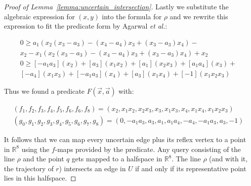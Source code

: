 \documentclass[a4paper, UKenglish]{lipics-v2018}
\newcommand{\etal}{\textit{et al.}\xspace}
\begin{document}
\begin{proof}[Proof of Lemma~\ref{lemma:uncertain_intersection}]
Lastly we substitute the algebraic expression for $(x,y)$ into the formula for $\rho$ and we rewrite this expression to fit the predicate form by Agarwal \etal \cite{agarwal2013range}:

\begin{align*}
    0 \ge a_1 (x_2 (x_3 - a_3) - (x_4 - a_4)x_3 + (x_3 - a_3) x_4) - \\
    x_2 - x_1 (x_2 (x_3 - a_3) - (x_4 - a_4)x_3 + (x_3 - a_3) x_4) + x_2 \\
    0 \ge [-a_1 a_3] (x_2) + [a_3]( x_1 x_2) + [a_1] (x_2 x_3) + [a_1a_4] (x_3) + \\
    [- a_4] (x_1 x_3) + [- a_1 a_3]( x_4) + [a_3] (x_1 x_4) + [-1](x_1 x_2 x_3)
\end{align*}

Thus we found a predicate $F(\vec{x}, \vec{a})$ with:

\begin{align*}
    (f_1, f_2, f_3, f_4, f_5, f_6, f_6, f_8) = (x_2, x_1x_2, x_2x_3, x_3, x_1x_3, x_4, x_1x_4, x_1x_2x_3) \\
    (g_0, g_1, g_2, g_3, g_4, g_5,g_6, g_7,g_8) = (0, -a_1a_3, a_3, a_1, a_1a_4, -a_4, -a_1a_3, a_3, -1)
\end{align*}

It follows that we can map every uncertain edge plus its reflex vertex to a point in $\mathbb{R}^8$ using the $f$-maps provided by the predicate. Any query consisting of the line $\rho$ and the point $q$ gets mapped to a halfspace in $\mathbb{R}^8$. The line $\rho$ (and with it, the trajectory of $r$) intersects an edge in $U$ if and only if its representative point lies in this halfspace. 
\end{proof}
\end{document}
